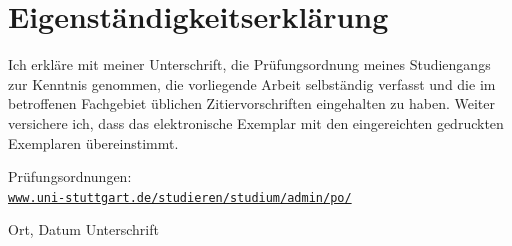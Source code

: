 \chapter*{Eigenständigkeitserklärung}
Ich erkläre mit meiner Unterschrift, die Prüfungsordnung meines Studiengangs zur 
Kenntnis genommen, die vorliegende Arbeit selbständig verfasst und die im 
betroffenen Fachgebiet üblichen Zitiervorschriften eingehalten zu haben. Weiter 
versichere ich, dass das elektronische Exemplar mit den eingereichten gedruckten 
Exemplaren übereinstimmt.
\vspace{5mm}

\noindent Prüfungsordnungen: \\ 
\href{http://www.uni-stuttgart.de/studieren/studium/admin/po/}{\verb"www.uni-stuttgart.de/studieren/studium/admin/po/"} 
\vspace{2cm}

\noindent \hrulefill

\noindent Ort, Datum \qquad \qquad \qquad \qquad \qquad \qquad Unterschrift

\thispagestyle{empty}
